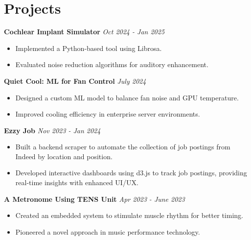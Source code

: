 \documentclass[letterpaper,10pt]{article}
\newcommand{\project}[3]{%
  \textbf{#1} \href{#2}{\small\faLink}\hfill\textit{#3}\par}
\begin{document}
\section{Projects}

\project{Cochlear Implant Simulator}{https://tingrubato.github.io/ps-cv/projects/ci-simulator}{Oct 2024 - Jan 2025}
\begin{itemize}
  \item Implemented a Python-based tool using Librosa.
  \item Evaluated noise reduction algorithms for auditory enhancement.
\end{itemize}

\project{Quiet Cool: ML for Fan Control}{https://tingrubato.github.io/ps-cv/projects/Quiet-Cool/}{July 2024}
\begin{itemize}
  \item Designed a custom ML model to balance fan noise and GPU temperature.
  \item Improved cooling efficiency in enterprise server environments.
\end{itemize}

\project{Ezzy Job}{https://tingrubato.github.io/ps-cv/blog/2024/ezzy-job/}{Nov 2023 - Jan 2024}
\begin{itemize}
  \item Built a backend scraper to automate the collection of job postings from Indeed by location and position.
  \item Developed interactive dashboards using d3.js to track job postings, providing real-time insights with enhanced UI/UX.
\end{itemize}

\project{A Metronome Using TENS Unit}{https://tingrubato.github.io/ps-cv/projects/Tensonome/}{Apr 2023 - June 2023}
\begin{itemize}
  \item Created an embedded system to stimulate muscle rhythm for better timing.
  \item Pioneered a novel approach in music performance technology.
\end{itemize}
\end{document}

